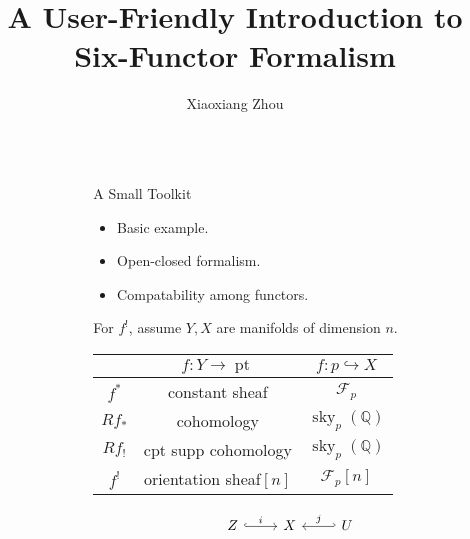 \documentclass[final]{beamer}
\title{A User-Friendly Introduction to Six-Functor Formalism}
\author{Xiaoxiang Zhou}
\institute[shortinst]{Humboldt-Universität zu Berlin}
\newlength{\sepwidth}
\newlength{\colwidth}
\newcommand{\separatorcolumn}{\begin{column}{\sepwidth}\end{column}}
\DeclareMathOperator{\sky}{\operatorname{sky}}
\DeclareMathOperator{\pt}{\operatorname{pt}}
\begin{document}
\begin{frame}[t]
\begin{columns}[t]
\separatorcolumn

\begin{column}{\colwidth}



  \begin{block}{A Small Toolkit}
  \begin{itemize}
  \item Basic example.
  \item Open-closed formalism.
  \item Compatability among functors.
  \end{itemize}
  For $f^!$, assume $Y,X$ are manifolds of dimension $n$.
  {
\renewcommand{\arraystretch}{1.2}
\renewcommand{\tabcolsep}{5mm}
 \begin{table}[]
 \centering
 \begin{tabular}{c|c|c}
\hline
  & $f:Y \longrightarrow \pt$ & $f: p \hookrightarrow X$ \\ \hline
 $f^*$ & constant sheaf & $\mathcal{F}_p$ \\ \hline
 $Rf_*$ & cohomology & $\sky_p(\mathbb{Q})$ \\ \hline
 $Rf_!$ & cpt supp cohomology & $\sky_p(\mathbb{Q})$ \\ \hline
 $f^!$ & orientation sheaf$[n]$ &  $\mathcal{F}_p[n]$ \\ \hline
 \end{tabular}
 \end{table}
 }
\[\begin{tikzcd}[ampersand replacement=\&]
	Z \& X \& U
	\arrow["i", hook, from=1-1, to=1-2]
	\arrow["j"', hook', from=1-3, to=1-2]
\end{tikzcd}\]


\end{block}
\end{column}
\end{columns}
\end{frame}
\end{document}
